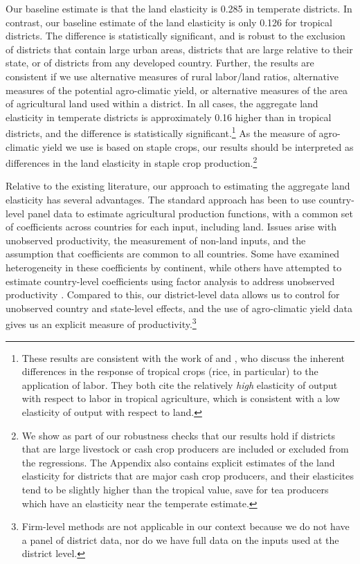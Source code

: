 \documentclass[12pt]{article}
\begin{document}
Our baseline estimate is that the land elasticity is 0.285 in temperate districts. In contrast, our baseline estimate of the land elasticity is only 0.126 for tropical districts. The difference is statistically significant, and is robust to the exclusion of districts that contain large urban areas, districts that are large relative to their state, or of districts from any developed country. Further, the results are consistent if we use alternative measures of rural labor/land ratios, alternative measures of the potential agro-climatic yield, or alternative measures of the area of agricultural land used within a district. In all cases, the aggregate land elasticity in temperate districts is approximately 0.16 higher than in tropical districts, and the difference is statistically significant.\footnote{These results are consistent with the work of \citet{Ruthenberg:1976zr} and \citet{bray1994}, who discuss the inherent differences in the response of tropical crops (rice, in particular) to the application of labor. They both cite the relatively \textit{high} elasticity of output with respect to labor in tropical agriculture, which is consistent with a low elasticity of output with respect to land.} As the measure of agro-climatic yield we use is based on staple crops, our results should be interpreted as differences in the land elasticity in staple crop production.\footnote{We show as part of our robustness checks that our results hold if districts that are large livestock or cash crop producers are included or excluded from the regressions. The Appendix also contains explicit estimates of the land elasticity for districts that are major cash crop producers, and their elasticites tend to be slightly higher than the tropical value, save for tea producers which have an elasticity near the temperate estimate.}

Relative to the existing literature, our approach to estimating the aggregate land elasticity has several advantages. The standard approach has been to use country-level panel data \citep{Hayami:1970ly,Hayami:1985cr,cpr1997,mm2001,Mundlak:2000dq,mbl2012,et2013mango} to estimate agricultural production functions, with a common set of coefficients across countries for each input, including land. Issues arise with unobserved productivity, the measurement of non-land inputs, and the assumption that coefficients are common to all countries. Some have examined heterogeneity in these coefficients \citep{gg2003,Wiebe2003Resource-Qualit} by continent, while others have attempted to estimate country-level coefficients using factor analysis to address unobserved productivity \citep{et2013mango,ev2016clim}. Compared to this, our district-level data allows us to control for unobserved country and state-level effects, and the use of agro-climatic yield data gives us an explicit measure of productivity.\footnote{Firm-level methods \citep{olleypakes1996,levpetrin2003} are not applicable in our context because we do not have a panel of district data, nor do we have full data on the inputs used at the district level.} 
\end{document}
